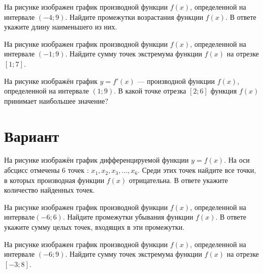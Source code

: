 \begin{taskBN}{2}
На рисунке изображен график производной функции $f(x)$, определенной на интервале $(-4;9)$. Найдите промежутки возрастания функции $f(x)$. В ответе укажите длину наименьшего из них.
\end{taskBN}

\begin{taskBN}{3}
На рисунке изображен график производной функции $f(x)$, определенной на интервале $(-1;9)$. Найдите сумму точек экстремума функции $f(x)$ на отрезке $[1;7]$.
\end{taskBN}

\begin{taskBN}{4}
На рисунке изображён график $y=f'(x)$ — производной функции $f(x)$, определенной на интервале $(1;9)$. В какой точке отрезка $[2; 6]$ функция $f(x)$ принимает наибольшее значение?
\end{taskBN}

\newpage\section{Вариант}\begin{taskBN}{1}
На рисунке изображён график дифференцируемой функции $y=f(x)$. На оси абсцисс отмечены 6 точек : $x_1, x_2, x_3, \dots, x_6$. Среди этих точек найдите все точки, в которых производная функции $f(x)$ отрицательна. В ответе укажите количество найденных точек.
\end{taskBN}

\begin{taskBN}{2}
На рисунке изображен график производной функции $f(x)$, определенной на интервале$(-6; 6)$. Найдите промежутки убывания функции $f(x)$. В ответе укажите сумму целых точек, входящих в эти промежутки.
\end{taskBN}

\begin{taskBN}{3}
На рисунке изображен график производной функции $f(x)$, определенной на интервале $(-6;9)$. Найдите сумму точек экстремума функции $f(x)$ на отрезке $[-3;8]$.
\end{taskBN}

